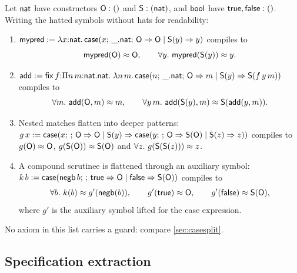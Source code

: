 \begin{example}
\label{ex:compile}
Let $\mathsf{nat}$ have constructors $\mathsf{O} : ()$ and $\mathsf{S} : (\mathsf{nat})$, and $\mathsf{bool}$
have $\mathsf{true}, \mathsf{false} : ()$.  Writing the hatted symbols without hats
for readability:
\begin{enumerate}[leftmargin=2em]
\item $\mathsf{mypred} \mathrel{:=} \lambda x{:}\mathsf{nat}.\,
  \mathsf{case}(x;\,\_.\mathsf{nat};\,\mathsf{O} \Rightarrow \mathsf{O} \mid \mathsf{S}(y) \Rightarrow y)$
  compiles to
  \[
    \mathsf{mypred}(\mathsf{O}) \approx \mathsf{O}, \qquad
    \forall y.\ \mathsf{mypred}(\mathsf{S}(y)) \approx y.
  \]
\item $\mathsf{add} \mathrel{:=} \mathsf{fix}\,f{:}\Pi n\,m{:}\mathsf{nat}.\mathsf{nat}.\;
  \lambda n\,m.\,\mathsf{case}(n;\,\_.\mathsf{nat};\,\mathsf{O} \Rightarrow m \mid \mathsf{S}(y)
  \Rightarrow \mathsf{S}(f\,y\,m))$ compiles to
  \[
    \forall m.\ \mathsf{add}(\mathsf{O}, m) \approx m, \qquad
    \forall y\,m.\ \mathsf{add}(\mathsf{S}(y), m) \approx
      \mathsf{S}(\mathsf{add}(y, m)).
  \]
\item Nested matches flatten into deeper patterns:
  $g\,x \mathrel{:=} \mathsf{case}(x;\,;\,\mathsf{O} \Rightarrow \mathsf{O} \mid \mathsf{S}(y) \Rightarrow
  \mathsf{case}(y;\,;\,\mathsf{O} \Rightarrow \mathsf{S}(\mathsf{O}) \mid \mathsf{S}(z) \Rightarrow z))$
  compiles to $g(\mathsf{O}) \approx \mathsf{O}$, $g(\mathsf{S}(\mathsf{O})) \approx \mathsf{S}(\mathsf{O})$ and
  $\forall z.\ g(\csS(\csS(z))) \feq z$.
\item A compound scrutinee is flattened through an auxiliary symbol:
  $k\,b \mathrel{:=} \mathsf{case}(\mathsf{negb}\,b;\,;\,\mathsf{true} \Rightarrow \mathsf{O} \mid
  \mathsf{false} \Rightarrow \mathsf{S}(\mathsf{O}))$ compiles to
  \[
    \forall b.\ k(b) \approx g'(\mathsf{negb}(b)), \qquad
    g'(\mathsf{true}) \approx \mathsf{O}, \qquad
    g'(\mathsf{false}) \approx \mathsf{S}(\mathsf{O}),
  \]
  where $g'$ is the auxiliary symbol lifted for the case expression.
\end{enumerate}
No axiom in this list carries a guard: compare
\cref{sec:casesplit}.
\end{example}

\subsection{Specification extraction}
\label{sec:translation-spec}

